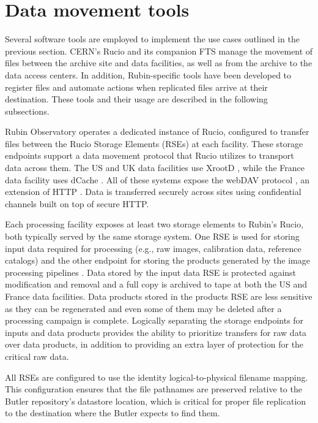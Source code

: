 \documentclass{webofc}
\begin{document}
\section{Data movement tools}
\label{section-data-movement-tools}

Several software tools are employed to implement the use cases outlined in the previous section. CERN's Rucio \cite{rucio2019} and its companion FTS \cite{FTS} manage the movement of files between the archive site and data facilities, as well as from the archive to the data access centers. In addition, Rubin-specific tools have been developed to register files and automate actions when replicated files arrive at their destination. These tools and their usage are described in the following subsections.

Rubin Observatory operates a dedicated instance of Rucio, configured to transfer files between the Rucio Storage Elements (RSEs) at each facility. These storage endpoints support a data movement protocol that Rucio utilizes to transport data across them. The US and UK data facilities use XrootD \cite{xrootd}, while the France data facility uses dCache \cite{dCache}. All of these systems expose the webDAV protocol \cite{webdav}, an extension of HTTP \cite{http1.1}. Data is transferred securely across sites using confidential channels built on top of secure HTTP.

Each processing facility exposes at least two storage elements to Rubin's Rucio, both typically served by the same storage system. One RSE is used for storing input data required for processing (e.g., raw images, calibration data, reference catalogs) and the other endpoint for storing the products generated by the image processing pipelines \cite{DMTN-213}. Data stored by the input data RSE is protected against modification and removal and a full copy is archived to tape at both the US and France data facilities. Data products stored in the products RSE are less sensitive as they can be regenerated and even some of them may be deleted after a processing campaign is complete. Logically separating the storage endpoints for inputs and data products provides the ability to prioritize transfers for raw data over data products, in addition to providing an extra layer of protection for the critical raw data.

All RSEs are configured to use the identity logical-to-physical filename mapping. This configuration ensures that the file pathnames are preserved relative to the Butler repository's datastore location, which is critical for proper file replication to the destination where the Butler expects to find them. 
\end{document}
